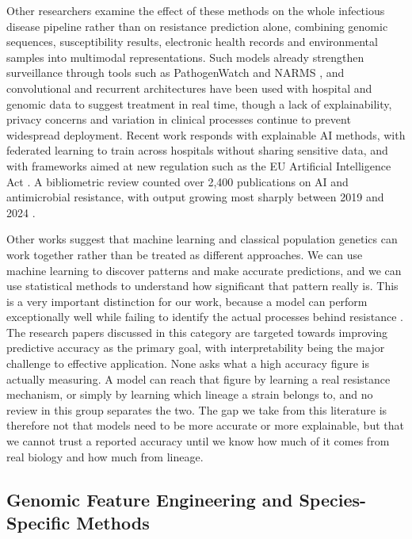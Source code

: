 \vspace{1em}

Other researchers examine the effect of these methods on the whole infectious disease pipeline rather than on resistance prediction alone, combining genomic sequences, susceptibility results, electronic health records and environmental samples into multimodal representations. Such models already strengthen surveillance through tools such as PathogenWatch and NARMS \cite{Bilal2025, Li2024}, and convolutional and recurrent architectures have been used with hospital and genomic data to suggest treatment in real time, though a lack of explainability, privacy concerns and variation in clinical processes continue to prevent widespread deployment. Recent work responds with explainable AI methods, with federated learning to train across hospitals without sharing sensitive data, and with frameworks aimed at new regulation such as the EU Artificial Intelligence Act \cite{Lastra2024, Dhaarani2025}. A bibliometric review counted over 2,400 publications on AI and antimicrobial resistance, with output growing most sharply between 2019 and 2024 \cite{wang2025aibibliometric}.

\vspace{1em}

Other works suggest that machine learning and classical population genetics can work together rather than be treated as different approaches. We can use machine learning to discover patterns and make accurate predictions, and we can use statistical methods to understand how significant that pattern really is. This is a very important distinction for our work, because a model can perform exceptionally well while failing to identify the actual processes behind resistance \cite{sheppard2025mlstats}. The research papers discussed in this category are targeted towards improving predictive accuracy as the primary goal, with interpretability being the major challenge to effective application. None asks what a high accuracy figure is actually measuring. A model can reach that figure by learning a real resistance mechanism, or simply by learning which lineage a strain belongs to, and no review in this group separates the two. The gap we take from this literature is therefore not that models need to be more accurate or more explainable, but that we cannot trust a reported accuracy until we know how much of it comes from real biology and how much from lineage.

\subsection{Genomic Feature Engineering and Species-Specific Methods}

